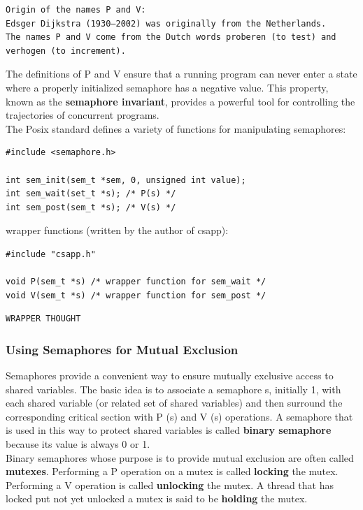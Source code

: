 \documentclass[11pt]{article}
\begin{document}
\begin{verbatim}
Origin of the names P and V:
Edsger Dijkstra (1930–2002) was originally from the Netherlands. 
The names P and V come from the Dutch words proberen (to test) and verhogen (to increment).
\end{verbatim}


The definitions of P and V ensure that a running program can never enter a state where a properly initialized semaphore has a negative value. This property, known as the \textbf{semaphore invariant}, provides a powerful tool for controlling the trajectories of concurrent programs.\\


The Posix standard defines a variety of functions for manipulating semaphores:\\
\begin{verbatim}
#include <semaphore.h>

int sem_init(sem_t *sem, 0, unsigned int value);
int sem_wait(set_t *s); /* P(s) */
int sem_post(sem_t *s); /* V(s) */
\end{verbatim}



wrapper functions (written by the author of csapp):\\
\begin{verbatim}
#include "csapp.h"

void P(sem_t *s) /* wrapper function for sem_wait */
void V(sem_t *s) /* wrapper function for sem_post */
\end{verbatim}

\begin{verbatim}
WRAPPER THOUGHT
\end{verbatim}


\subsubsection{Using Semaphores for Mutual Exclusion}
\label{sec:org82eed04}
Semaphores provide a convenient way to ensure mutually exclusive access to shared variables. The basic idea is to associate a semaphore s, initially 1, with each shared variable (or related set of shared variables) and then surround the corresponding critical section with P (s) and V (s) operations. A semaphore that is used in this way to protect shared variables is called \textbf{binary semaphore} because its value is always 0 or 1.\\

Binary semaphores whose purpose is to provide mutual exclusion are often called \textbf{mutexes}. Performing a P operation on a mutex is called \textbf{locking} the mutex. Performing a V operation is called \textbf{unlocking} the mutex. A thread that has locked put not yet unlocked a mutex is said to be \textbf{holding} the mutex.\\
\end{document}
